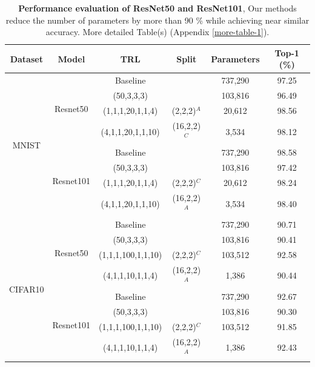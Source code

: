 \documentclass{article}
\begin{document}
	\begin{table}
		\centering
		\caption{
		\textbf{Performance evaluation of ResNet50 and ResNet101}, Our methods reduce the number of parameters by more than 90 \% while achieving near similar accuracy. More detailed Table(s) (Appendix \ref{more-table-1}).
			}
		\label{table:resnet_mnist_cifar10}
		\begin{tabular}{c c c c c c}
			\toprule
			\textbf{Dataset} & \textbf{Model} & \textbf{TRL} & \textbf{Split} & \textbf{Parameters} & \textbf{Top-1 (\%)} \\
			\midrule
			\multirow{8}{*}{MNIST} & \multirow{4}{*}{Resnet50} &  Baseline &   & 737,290 & 97.25 \\ 
			& & (50,3,3,3) &   & 103,816 & 96.49 \\ 
			& & (1,1,1,20,1,1,4) & (2,2,2)\(^A\) & 20,612 & 98.56 \\ 
			& & (4,1,1,20,1,1,10) & (16,2,2)\(^C\) & 3,534 & 98.12 \\ 
			\cmidrule(lr){2-6}
			& \multirow{4}{*}{Resnet101} &  Baseline &   & 737,290 & 98.58 \\ 
			& & (50,3,3,3) &   & 103,816 & 97.42 \\ 
			& & (1,1,1,20,1,1,4) & (2,2,2)\(^C\) & 20,612 & 98.24 \\ 
			& & (4,1,1,20,1,1,10) & (16,2,2)\(^A\) & 3,534 & 98.40 \\ 
			\midrule
			\multirow{8}{*}{CIFAR10} & \multirow{4}{*}{Resnet50} &  Baseline &   & 737,290 & 90.71 \\ 
			& & (50,3,3,3) &   & 103,816 & 90.41 \\ 
			& & (1,1,1,100,1,1,10) & (2,2,2)\(^C\) & 103,512 & 92.58 \\ 
			& & (4,1,1,10,1,1,4) & (16,2,2)\(^A\) & 1,386 & 90.44 \\ 
			\cmidrule(lr){2-6}
			& \multirow{4}{*}{Resnet101} &  Baseline &   & 737,290 & 92.67 \\ 
			& & (50,3,3,3) &   & 103,816 & 90.30 \\ 
			& & (1,1,1,100,1,1,10) & (2,2,2)\(^C\) & 103,512 & 91.85 \\ 
			& & (4,1,1,10,1,1,4) & (16,2,2)\(^A\) & 1,386 & 92.43 \\ 
			\bottomrule
		\end{tabular}
	\end{table}
	
\end{document}
